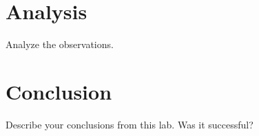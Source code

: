 \documentclass[12pt]{article}
\begin{document}
\section{Analysis}

Analyze the observations.

\section{Conclusion}

Describe your conclusions from this lab.
Was it successful?

\clearpage

%
%

\end{document}
